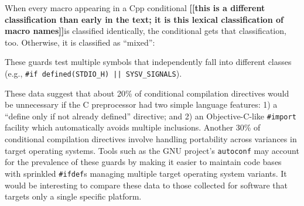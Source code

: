 \documentclass[10pt]{article}
\newcommand{\comment}[1]{\textbf{[[#1]]}}
\newcommand{\ppd}[1]{\texttt{\##1}}
\newcommand{\captionsmall}[1]{\caption[]{\small #1}}
\begin{document}
When every macro appearing in a Cpp conditional \comment{this is a
  different classification than early in the text; it is this lexical
  classification of macro names}is classified identically,
the conditional gets that classification, too.  Otherwise, it is classified
as ``mixed'':

\begin{description}\itemsep 0pt \parskip 0pt
\item[Mixed usage] These guards test multiple symbols
      that independently fall into different classes (e.g.,
      {\tt \#if defined(\verb|STDIO_H|) || \verb|SYSV_SIGNALS|}).
\end{description}

These data suggest that about 20\% of conditional compilation directives
would be unnecessary if the C preprocessor had two simple language
features: 1) a ``define only if not already defined'' directive; and 2)
an Objective-C-like \ppd{import} facility which automatically avoids
multiple inclusions.  Another 30\% of conditional compilation directives
involve handling portability across variances in target operating
systems.  Tools such as the GNU project's \texttt{autoconf} may account
for the prevalence of these guards by making it easier to maintain code
bases with sprinkled \ppd{ifdef}s managing multiple target operating
system variants.  It would be interesting to compare these data to those
collected for software that targets only a single specific platform.

% 
% 
% 
\end{document}
